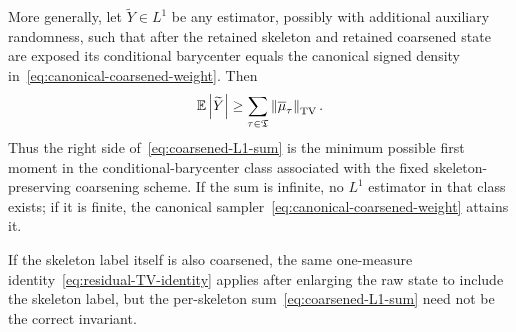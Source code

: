 \begin{theorem}
More generally, let $\widetilde Y\in L^1$ be any estimator, possibly with additional auxiliary randomness, such that after the retained skeleton and retained coarsened state are exposed its conditional barycenter equals the canonical signed density in~\eqref{eq:canonical-coarsened-weight}. Then
\begin{equation}
  \mathbb E\left|\widetilde Y\right|
  \geq
  \sum_{\tau\in\mathfrak T}
  \left\lVert\overline\mu_\tau\right\rVert_{\mathrm{TV}}.
  \label{eq:coarsened-jensen-lower}
\end{equation}
Thus the right side of~\eqref{eq:coarsened-L1-sum} is the minimum possible first moment in the conditional-barycenter class associated with the fixed skeleton-preserving coarsening scheme. If the sum is infinite, no $L^1$ estimator in that class exists; if it is finite, the canonical sampler~\eqref{eq:canonical-coarsened-weight} attains it.

If the skeleton label itself is also coarsened, the same one-measure identity~\eqref{eq:residual-TV-identity} applies after enlarging the raw state to include the skeleton label, but the per-skeleton sum~\eqref{eq:coarsened-L1-sum} need not be the correct invariant.
\end{theorem}

